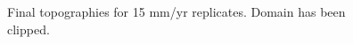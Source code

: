 \begin{figure}[!ht]
	\caption{Final topographies for 15 mm/yr replicates. Domain has been clipped.}
	\label{fig:015topo}
\end{figure}

